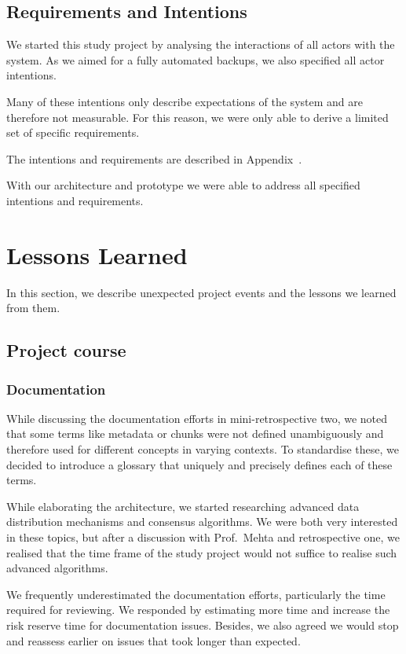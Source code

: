 \subsection{Requirements and Intentions}
We started this study project by analysing the interactions of all actors with the system.
As we aimed for a fully automated backups, we also specified all actor intentions.

Many of these intentions only describe expectations of the system and are therefore not measurable. For this reason, we were only able to derive a limited set of specific requirements.

The intentions and requirements are described in Appendix~.

With our architecture and prototype we were able to address all specified intentions and requirements.


\section{Lessons Learned}

In this section, we describe unexpected project events and the lessons we learned from them.

\subsection{Project course}
\subsubsection{Documentation}
While discussing the documentation efforts in mini-retrospective two, we noted that some terms like metadata or chunks were not defined unambiguously and therefore used for different concepts in varying contexts. To standardise these, we decided to introduce a glossary that uniquely and precisely defines each of these terms.

While elaborating the architecture, we started researching advanced data distribution mechanisms and consensus algorithms. We were both very interested in these topics, but after a discussion with Prof.~Mehta and retrospective one, we realised that the time frame of the study project would not suffice to realise such advanced algorithms.

We frequently underestimated the documentation efforts, particularly the time required for reviewing. We responded by estimating more time and increase the risk reserve time for documentation issues. Besides, we also agreed we would stop and reassess earlier on issues that took longer than expected.

